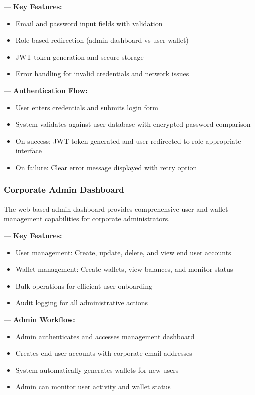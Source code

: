 — \textbf{Key Features:}
\begin{itemize}[nosep,leftmargin=*,label=•]
\item Email and password input fields with validation
\item Role-based redirection (admin dashboard vs user wallet)
\item JWT token generation and secure storage
\item Error handling for invalid credentials and network issues
\end{itemize}

— \textbf{Authentication Flow:}
\begin{itemize}[nosep,leftmargin=*,label=•]
\item User enters credentials and submits login form
\item System validates against user database with encrypted password comparison
\item On success: JWT token generated and user redirected to role-appropriate interface
\item On failure: Clear error message displayed with retry option
\end{itemize}

\subsubsection{Corporate Admin Dashboard}

The web-based admin dashboard provides comprehensive user and wallet management capabilities for corporate administrators.

— \textbf{Key Features:}
\begin{itemize}[nosep,leftmargin=*,label=•]
\item User management: Create, update, delete, and view end user accounts
\item Wallet management: Create wallets, view balances, and monitor status
\item Bulk operations for efficient user onboarding
\item Audit logging for all administrative actions
\end{itemize}

— \textbf{Admin Workflow:}
\begin{itemize}[nosep,leftmargin=*,label=•]
\item Admin authenticates and accesses management dashboard
\item Creates end user accounts with corporate email addresses
\item System automatically generates wallets for new users
\item Admin can monitor user activity and wallet status
\end{itemize}

